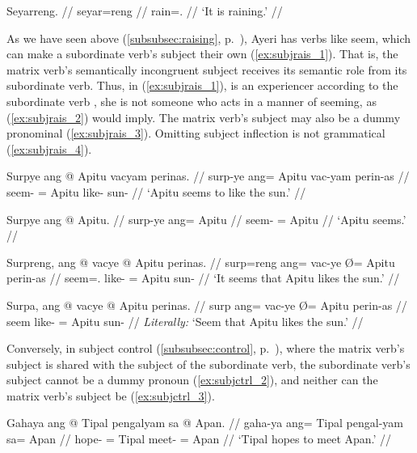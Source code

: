 \ex\label{ex:weatherverb}
\begingl
	\gla Seyarreng. //
	\glb seyar=reng //
	\glc rain=\TsgI{}.\Aarg{} //
	\glft `It is raining.' //
\endgl\xe

As we have seen above (\autoref{subsubsec:raising},
p.~\pageref{subsubsec:raising}), Ayeri has verbs like 
{seem}, which can make a subordinate verb's subject their own
(\ref{ex:subjrais_1}). That is, the matrix verb's semantically incongruent
subject receives its semantic role from its subordinate verb. Thus, in
(\ref{ex:subjrais_1}),  is an experiencer according to the
subordinate verb , she is not someone who acts in
a manner of seeming, as (\ref{ex:subjrais_2}) would imply. The matrix verb's
subject may also be a dummy pronominal (\ref{ex:subjrais_3}). Omitting subject
inflection is not grammatical (\ref{ex:subjrais_4}).

\pex\label{ex:subjrais}
\a\label{ex:subjrais_1}\begingl
	\gla Surpye ang @ Apitu vacyam perinas. //
	\glb surp-ye ang= Apitu vac-yam perin-as //
	\glc seem-\TsgF{} \Aarg{}= Apitu like-\Ptcp{} sun-\Parg{} //
	\glft `Apitu seems to like the sun.' //
\endgl

\a\label{ex:subjrais_2}\ljudge*\begingl
	\gla Surpye ang @ Apitu. //
	\glb surp-ye ang= Apitu //
	\glc seem-\TsgF{} \Aarg{}= Apitu //
	\glft `Apitu seems.' //
\endgl

\a\label{ex:subjrais_3}\begingl
	\gla Surpreng, ang @ vacye {} @ Apitu perinas. //
	\glb surp=reng ang= vac-ye Ø= Apitu perin-as //
	\glc seem=\TsgI{}.\Aarg{} \AgtT{} like-\TsgF{} \Top{}= Apitu sun-\Parg{} //
	\glft `It seems that Apitu likes the sun.' //
\endgl

\a\label{ex:subjrais_4}\ljudge*\begingl
	\gla Surpa, ang @ vacye {} @ Apitu perinas. //
	\glb surp ang= vac-ye Ø= Apitu perin-as //
	\glc seem \AgtT{} like-\TsgF{} \Top{}= Apitu sun-\Parg{} //
	\glft \textit{Literally:} `Seem that Apitu likes the sun.' //
\endgl

\xe

Conversely, in subject control (\autoref{subsubsec:control}, 
p.~\pageref{subsubsec:control}), where the matrix verb's subject is shared with
the subject of the subordinate verb, the subordinate verb's subject cannot
be a dummy pronoun (\ref{ex:subjctrl_2}), and neither can the matrix verb's
subject be (\ref{ex:subjctrl_3}).

\pex\label{ex:subjctrl}
\a\label{ex:subjctrl_1}\begingl
	\gla Gahaya ang @ Tipal pengalyam sa @ Apan. //
	\glb gaha-ya ang= Tipal pengal-yam sa= Apan //
	\glc hope-\TsgM{} \Aarg{}= Tipal meet-\Ptcp{} \Parg{}= Apan //
	\glft `Tipal hopes to meet Apan.' //
\endgl

